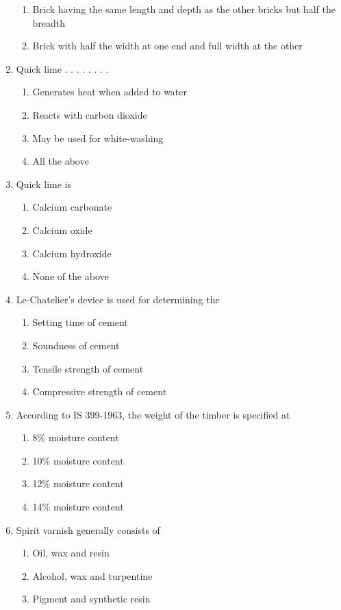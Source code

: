 \documentclass[11pt,a4paper]{article}
\begin{document}
\begin{enumerate}
\begin{enumerate}[label=\Alph*.]
\item{Brick having the same length and depth as the other bricks but half the breadth}
\item{Brick with half the width at one end and full width at the other}
\end{enumerate}
\item{Quick lime . . . . . . . .}
\begin{enumerate}[label=\Alph*.]
\item{Generates heat when added to water}
\item{Reacts with carbon dioxide}
\item{May be used for white-washing}
\item{All the above}
\end{enumerate}
\item{Quick lime is}
\begin{enumerate}[label=\Alph*.]
\item{Calcium carbonate}
\item{Calcium oxide}
\item{Calcium hydroxide}
\item{None of the above}
\end{enumerate}
\item{Le-Chatelier's device is used for determining the}
\begin{enumerate}[label=\Alph*.]
\item{Setting time of cement}
\item{Soundness of cement}
\item{Tensile strength of cement}
\item{Compressive strength of cement}
\end{enumerate}
\item{According to IS 399-1963, the weight of the timber is specified at}
\begin{enumerate}[label=\Alph*.]
\item{8\% moisture content}
\item{10\% moisture content}
\item{12\% moisture content}
\item{14\% moisture content}
\end{enumerate}
\item{Spirit varnish generally consists of}
\begin{enumerate}[label=\Alph*.]
\item{Oil, wax and resin}
\item{Alcohol, wax and turpentine}
\item{Pigment and synthetic resin}

\end{enumerate}
\end{enumerate}
\end{document}

